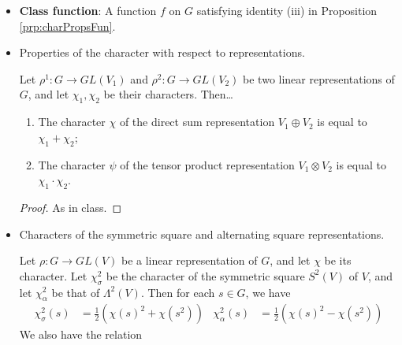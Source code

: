 \documentclass[../notes.tex]{subfiles}
\begin{document}
\begin{itemize}
\begin{proposition}
\begin{proof}
            \begin{equation*}
                \chi(tst^{-1}) = \tr(\rho_{tst^{-1}})
                = \tr(\rho_t\rho_s\rho_{t^{-1}})
                = \tr(uv)
                = \tr(vu)
                = \tr(\rho_{t^{-1}}\rho_t\rho_s)
                = \tr(\rho_s)
                = \chi(s)
            \end{equation*}
        \end{proof}
    \end{proposition}
    \item \textbf{Class function}: A function $f$ on $G$ satisfying identity (iii) in Proposition \ref{prp:charPropsFun}.
    \item Properties of the character with respect to representations.
    \begin{proposition}\label{prp:charPropsSumProd}
        Let $\rho^1:G\to GL(V_1)$ and $\rho^2:G\to GL(V_2)$ be two linear representations of $G$, and let $\chi_1,\chi_2$ be their characters. Then\dots
        \begin{enumerate}[label={\textup{(\roman*)}}]
            \item The character $\chi$ of the direct sum representation $V_1\oplus V_2$ is equal to $\chi_1+\chi_2$;
            \item The character $\psi$ of the tensor product representation $V_1\otimes V_2$ is equal to $\chi_1\cdot\chi_2$.
        \end{enumerate}
        \begin{proof}
            As in class.
        \end{proof}
    \end{proposition}
    \item Characters of the symmetric square and alternating square representations.
    \begin{proposition}
        Let $\rho:G\to GL(V)$ be a linear representation of $G$, and let $\chi$ be its character. Let $\chi_\sigma^2$ be the character of the symmetric square $S^2(V)$ of $V$, and let $\chi_\alpha^2$ be that of $\Lambda^2(V)$. Then for each $s\in G$, we have
        \begin{align*}
            \chi_\sigma^2(s) &= \frac{1}{2}(\chi(s)^2+\chi(s^2))&
            \chi_\alpha^2(s) &= \frac{1}{2}(\chi(s)^2-\chi(s^2))
        \end{align*}
        We also have the relation
        \begin{equation*}

\end{equation*}
\end{proposition}
\end{itemize}
\end{document}
